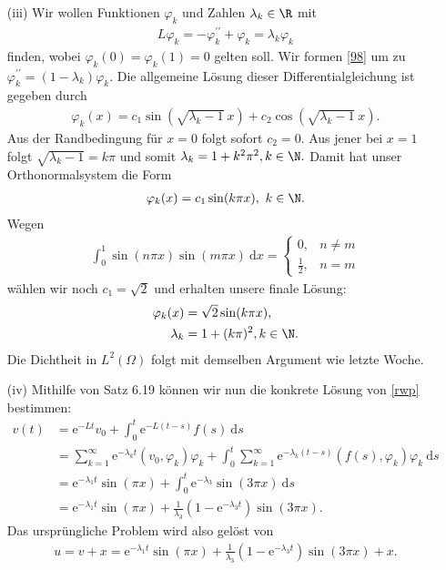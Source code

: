 \begin{solution}
\begin{itemize}
    \item[(iii)] Wir wollen Funktionen $\varphi_k$ und Zahlen $\lambda_k \in \R$ mit
    \begin{align}\label{98}
        L\varphi_k = - \varphi_k^{\prime\prime} + \varphi_k = \lambda_k\varphi_k
    \end{align}
    finden, wobei $\varphi_k(0) = \varphi_k(1) = 0$ gelten soll.
    Wir formen \eqref{98} um zu $\varphi_k^{\prime\prime} = (1 - \lambda_k) \varphi_k$.
    Die allgemeine Lösung dieser Differentialgleichung ist gegeben durch
    \begin{align*}
        \varphi_k(x) = c_1 \sin(\sqrt{\lambda_k - 1}~ x) + c_2 \cos(\sqrt{\lambda_k - 1}~ x).
    \end{align*}
    Aus der Randbedingung für $x = 0$ folgt sofort $c_2 = 0.$ Aus jener bei $x = 1$ folgt $\sqrt{\lambda_k - 1} = k\pi$ und somit $\lambda_k = 1 + k^2\pi^2, k \in \N.$
    Damit hat unser Orthonormalsystem die Form
    \begin{align*}
        \varphi_k(x) = c_1 \sin(k\pi x),~ k \in \N.
    \end{align*}
    Wegen
    \begin{align*}
        \int_0^1 \sin(n\pi x) \sin(m\pi x) \mathrm{~d}x =
        \begin{cases}
            0, & n \neq m\\
            \frac{1}{2}, & n = m
        \end{cases}
    \end{align*}
    wählen wir noch $c_1 = \sqrt 2$ und erhalten unsere finale Lösung:
    \begin{align*}
        \varphi_k(x) &= \sqrt 2 \sin(k\pi x),\\
        \lambda_k &= 1 + (k\pi)^2, k \in \N.
    \end{align*}
    Die Dichtheit in $L^2(\Omega)$ folgt mit demselben Argument wie letzte Woche.
    \item[(iv)] Mithilfe von Satz 6.19 können wir nun die konkrete Lösung von \eqref{rwp} bestimmen:
    \begin{align*}
        v(t) &= \mathrm{e}^{-Lt}v_0 + \int_0^t \mathrm{e}^{-L(t-s)} f(s) \mathrm{~d} s\\
        &= \sum_{k = 1}^\infty \mathrm{e}^{-\lambda_k t}(v_0, \varphi_k) \varphi_k + \int_0^t \sum_{k = 1}^\infty \mathrm{e}^{-\lambda_k (t-s)}(f(s), \varphi_k) \varphi_k \mathrm{~d} s\\
        &= \mathrm{e}^{-\lambda_1 t} \sin(\pi x) + \int_0^t \mathrm{e}^{-\lambda_3} \sin(3\pi x) \mathrm{~d} s \\
        &= \mathrm{e}^{-\lambda_1 t} \sin(\pi x) + \frac{1}{\lambda_3} (1 - \mathrm{e}^{-\lambda_3 t}) \sin(3\pi x).
    \end{align*}
    Das ursprüngliche Problem wird also gelöst von
    \begin{align*}
        u = v + x = \mathrm{e}^{-\lambda_1 t} \sin(\pi x) + \frac{1}{\lambda_3} (1 - \mathrm{e}^{-\lambda_3 t}) \sin(3\pi x) + x.
    \end{align*}
    \end{itemize}


\end{solution}

